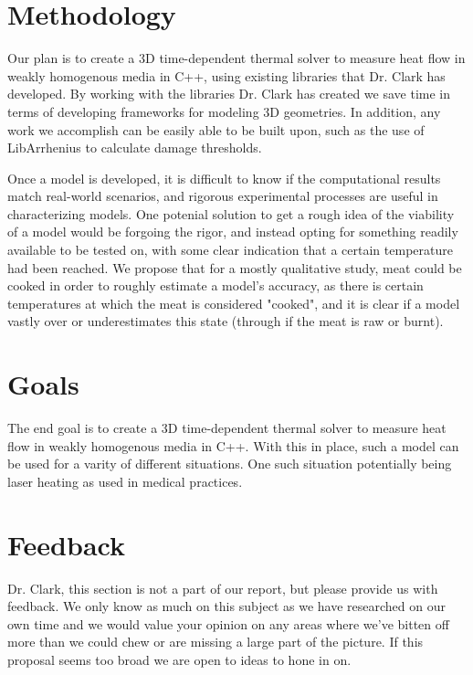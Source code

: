 \documentclass[12pt]{article}
\begin{document}
\section{Methodology}
Our plan is to create a 3D time-dependent thermal solver to measure heat flow in weakly homogenous media in C++, using existing libraries that Dr. Clark has developed. By working with the libraries Dr. Clark has created we save time in terms of developing frameworks for modeling 3D geometries. In addition, any work we accomplish can be easily able to be built upon, such as the use of LibArrhenius to calculate damage thresholds. 

Once a model is developed, it is difficult to know if the computational results match real-world scenarios, and rigorous experimental processes are useful in characterizing models. One potenial solution to get a rough idea of the viability of a model would be forgoing the rigor, and instead opting for something readily available to be tested on, with some clear indication that a certain temperature had been reached. We propose that for a mostly qualitative study, meat could be cooked in order to roughly estimate a model's accuracy, as there is certain temperatures at which the meat is considered "cooked", and it is clear if a model vastly over or underestimates this state (through if the meat is raw or burnt). 

\section{Goals}
The end goal is to create a 3D time-dependent thermal solver to measure heat flow in weakly homogenous media in C++. With this in place, such a model can be used for a varity of different situations. One such situation  potentially being laser heating as used in medical practices. 

\section{Feedback} 
Dr. Clark, this section is not a part of our report, but please provide us with feedback. We only know as much on this subject as we have researched on our own time and we would value your opinion on any areas where we've bitten off more than we could chew or are missing a large part of the picture. If this proposal seems too broad we are open to ideas to hone in on. 
\end{document}
